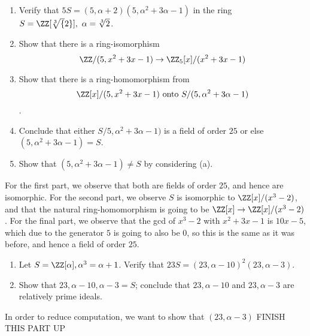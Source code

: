 \begin{problem}
\begin{enumerate}[label=(\alph*)]
    \item Verify that \(5S=(5,\alpha+2)(5,\alpha^2+3\alpha-1)\) in the ring \(S=\ZZ[\sqrt[3]{2}], \ \alpha=\sqrt[3]{2}\).
    \item Show that there is a ring-isomorphism \[ \ZZ/(5,x^2+3x-1) \to \ZZ_5[x]/(x^2+3x-1)\]
    \item Show that there is a ring-homomorphism from \[\ZZ[x]/(5,x^2+3x-1) \ \textrm{onto} \ S/(5,\alpha^2+3\alpha-1)\].
    \item Conclude that either \(S/5,\alpha^2+3\alpha-1)\) is a field of order \(25\) or else \((5,\alpha^2+3\alpha-1) = S\).
    \item Show that \((5,\alpha^2+3\alpha-1) \neq S\) by considering (a).
\end{enumerate}
\end{problem}
For the first part, we observe that both are fields of order \(25\), and hence are isomorphic. For the second part, we observe \(S\) is isomorphic to \(\ZZ[x]/(x^3-2)\), and that the natural ring-homomorphism is going to be \(\ZZ[x] \to \ZZ[x]/(x^3-2)\). For the final part, we observe that the gcd of \(x^3-2\) with \(x^2+3x-1\) is \(10x-5\), which due to the generator \(5\) is going to also be \(0\), so this is the same as it was before, and hence a field of order \(25\).
\begin{problem}
\begin{enumerate}[label=(\alph*)]
    \item Let \(S = \ZZ[\alpha], \alpha^3=\alpha+1\). Verify that \(23S=(23,\alpha-10)^2(23,\alpha-3)\).
    \item Show that \(23,\alpha-10,\alpha-3=S\); conclude that \(23, \alpha-10\) and \(23,\alpha-3\) are relatively prime ideals.
\end{enumerate}
\end{problem}
In order to reduce computation, we want to show that \((23,\alpha-3)\)
FINISH THIS PART UP



